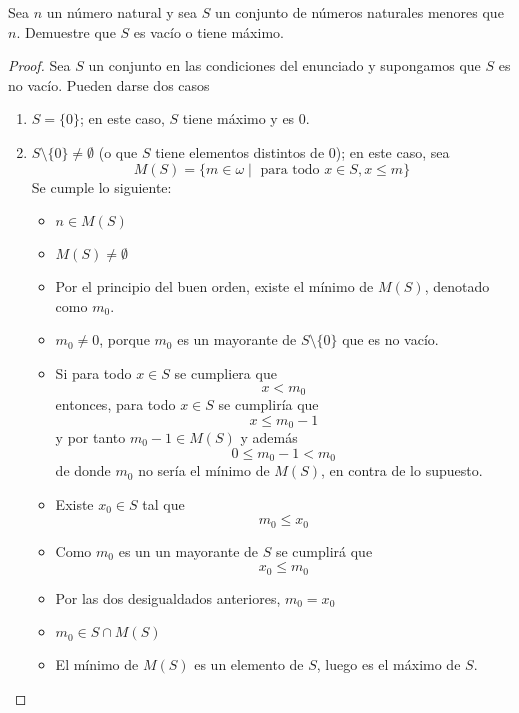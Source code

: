 \begin{ejercicio}
Sea $n$ un número natural y sea $S$ un conjunto de números naturales menores que $n$. Demuestre que $S$ es vacío o tiene máximo.
\begin{proof}
Sea $S$ un conjunto en las condiciones del enunciado y supongamos que $S$ es no vacío. Pueden darse dos casos
\begin{enumerate}
    \item $S = \{0\}$; en este caso, $S$ tiene máximo y es $0$.
    \item $S\setminus\{0\} \neq \emptyset$ (o que $S$ tiene elementos distintos de $0$); en este caso, sea
    \begin{equation*}
        M(S) = \{ m \in \omega \mid \text{\ para todo\ } x \in S, x \leq m\}
    \end{equation*}
    Se cumple lo siguiente:
    \begin{itemize}
        \item $n \in M(S)$
        \item $M(S) \neq \emptyset$
        \item Por el principio del buen orden, existe el mínimo de $M(S)$, denotado como $m_0$.
        \item $m_0 \neq 0$, porque $m_0$ es un mayorante de $S\setminus \{0\}$ que es no vacío.
        \item Si para todo $x \in S$ se cumpliera que
        \begin{equation*}
            x < m_0
        \end{equation*}
        entonces, para todo $x \in S$ se cumpliría que 
        \begin{equation*}
            x \leq m_0 -1
        \end{equation*}
        y por tanto $m_0 - 1 \in M(S)$ y además
        \begin{equation*}
            0 \leq m_0 -1 < m_0
        \end{equation*}
        de donde $m_0$ no sería el mínimo de $M(S)$, en contra de lo supuesto.

        \item Existe $x_0 \in S$ tal que
        \begin{equation*}
            m_0 \leq x_0
        \end{equation*}
        \item Como $m_0$ es un un mayorante de $S$ se cumplirá que 
        \begin{equation*}
            x_0 \leq m_0
        \end{equation*}
        \item Por las dos desigualdados anteriores, $m_0 = x_0$
        \item $m_0 \in S \cap M(S)$
        \item El mínimo de $M(S)$ es un elemento de $S$, luego es el máximo de $S$.
    \end{itemize}
\end{enumerate}
\end{proof}
\end{ejercicio}

